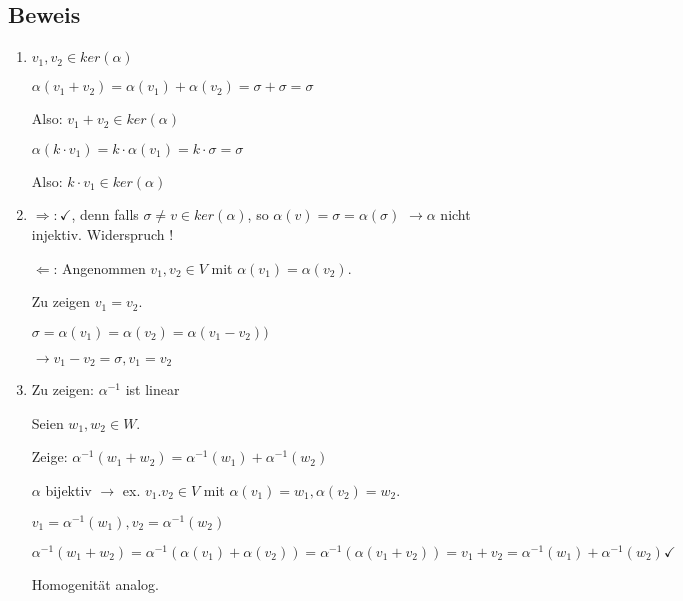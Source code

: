 \documentclass[a4paper, openany]{book}
\begin{document}
      \subsection{Beweis}

      \begin{enumerate}[label=(\alph*)]
        \item $v_1, v_2 \in ker(\alpha)$

        $\alpha(v_1 + v_2) = \alpha(v_1) + \alpha(v_2) = \sigma + \sigma = \sigma$

        \par \medskip

        Also: $v_1 + v_2 \in ker(\alpha)$

        \par \medskip

        $\alpha(k \cdot v_1) = k \cdot \alpha(v_1) = k \cdot \sigma = \sigma$

        \par \medskip

        Also: $k \cdot v_1 \in ker(\alpha)$

        \item $\Rightarrow : \checkmark$, denn falls $\sigma \neq v \in ker(\alpha)$, so $\alpha(v) = \sigma = \alpha(\sigma)$ $\rightarrow \alpha$ nicht injektiv. Widerspruch !

        $\Leftarrow$: Angenommen $v_1, v_2 \in V$ mit $\alpha(v_1) = \alpha(v_2)$.

        Zu zeigen $v_1 = v_2$.

        $\sigma = \alpha(v_1) = \alpha(v_2) = \alpha(v_1 - v_2))$

        $\rightarrow v_1 - v_2 = \sigma, v_1 = v_2$

        \item Zu zeigen: $\alpha^{-1}$ ist linear

        Seien $w_1, w_2 \in W$.

        Zeige: $\alpha^{-1}(w_1+w_2) = \alpha^{-1}(w_1) + \alpha^{-1}(w_2)$

        $\alpha$ bijektiv $\rightarrow$ ex. $v_1. v_2 \in V$ mit $\alpha(v_1) = w_1, \alpha(v_2) = w_2$.

        $v_1 = \alpha^{-1}(w_1) , v_2 = \alpha^{-1}(w_2)$

        \par \medskip

        $\alpha^{-1} (w_1+ w_2) = \alpha^{-1}(\alpha(v_1) + \alpha(v_2)) = \alpha^{-1}(\alpha(v_1 + v_2)) = v_1 + v_2 = \alpha^{-1}(w_1) + \alpha^{-1}(w_2) \checkmark$

        \par \medskip

        Homogenität analog.
      \end{enumerate}
\end{document}

